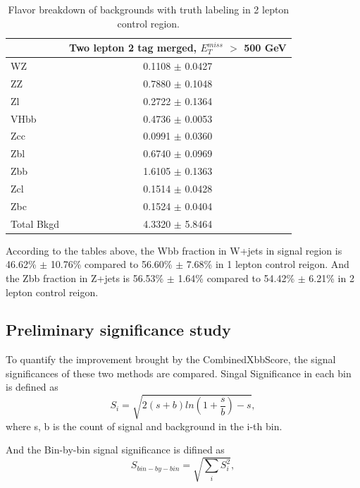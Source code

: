 \begin{table}
    \centering
    \scriptsize
    \begin{tabular}{l|c|}
        \cline{2-2}
        & \multicolumn{1}{c|}{Two lepton 2 tag merged, $E_{T}^{miss}$ $>$ 500 GeV}
        \\ \hline
        \tiny
        WZ   & 0.1108        $\pm$ 0.0427      \\ 
        ZZ    &0.7880        $\pm$  0.1048      \\ 
        Zl    &0.2722        $\pm$  0.1364      \\ 
        VHbb  &  0.4736      $\pm$ 0.0053       \\ 
        Zcc   & 0.0991        $\pm$ 0.0360      \\ 
        Zbl   & 0.6740        $\pm$ 0.0969      \\ 
        Zbb   & 1.6105        $\pm$ 0.1363      \\ 
        Zcl   & 0.1514        $\pm$ 0.0428      \\ 
        Zbc   & 0.1524        $\pm$ 0.0404      \\ 
        \hline
        Total Bkgd  &  4.3320    $\pm$ 5.8464 \\  
    \end{tabular}

    \caption{Flavor breakdown of backgrounds with truth labeling in 2 lepton control region.}
    \label{tab:fl2}

\end{table}
According to the tables above, the Wbb fraction in W+jets in signal region is 46.62\% $\pm$ 10.76\% compared to 56.60\% $\pm$ 7.68\% in 1 lepton control reigon. And 
the Zbb fraction in Z+jets is 56.53\% $\pm$ 1.64\% compared to 54.42\%  $\pm$ 6.21\% in 2 lepton control reigon. 



\subsection{Preliminary significance study}
\par To quantify the improvement brought by the CombinedXbbScore, the signal significances of these two methods are compared.
Singal Significance in each bin is defined as
\begin{equation}
    S_i = \sqrt{2(s + b)ln(1 + \frac{s}{b}) − s},
\end{equation}
where s, b is the count of signal and background in the i-th bin.
\par And the Bin-by-bin signal significance is difined as
\begin{equation}
    S_{bin-by-bin}  = \sqrt{\sum_i S_i^2}, 
\end{equation}



